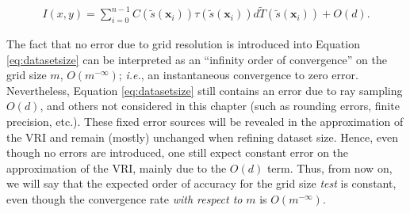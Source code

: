 %
%
\begin{eqnarray}
I(x,y) = \sum_{i = 0} ^ {n - 1} C( \tilde{s}( \mathbf{x}_i)) \tau(
\tilde{s}( \mathbf{x}_i)) d \tilde{T}(\tilde{s}(\mathbf{x}_i)) + O(d). \label{eq:datasetsize}
\end{eqnarray}


The fact that no error due to grid resolution is introduced 
into Equation \eqref{eq:datasetsize} can
be interpreted as an ``infinity order of convergence'' on the grid
size $m$, $O(m^{-\infty})$; {\em i.e.}, an instantaneous convergence to zero error.
%
Nevertheless, Equation \eqref{eq:datasetsize} still contains an error due 
to ray sampling $O(d)$, and others  not considered in this chapter 
(such as rounding errors, finite precision, etc.).  
These fixed error sources will be revealed in the approximation 
of the VRI and remain (mostly) unchanged when refining dataset size.
Hence, even though no errors are introduced, one still expect
constant error on the approximation of the VRI, mainly due to the $O(d)$ term. 
Thus, from now on, we will say that the expected order of accuracy for
the grid size \emph{test} is constant, even though the convergence rate \emph{with respect to}
$m$ is $O(m^{-\infty})$.

